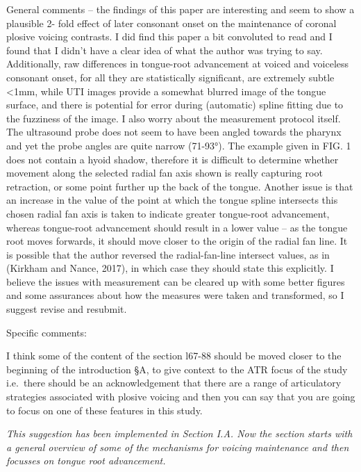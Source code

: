 \documentclass[]{article}
\begin{document}
General comments -- the findings of this paper are interesting and seem
to show a plausible 2- fold effect of later consonant onset on the
maintenance of coronal plosive voicing contrasts. I did find this paper
a bit convoluted to read and I found that I didn't have a clear idea of
what the author was trying to say. Additionally, raw differences in
tongue-root advancement at voiced and voiceless consonant onset, for all
they are statistically significant, are extremely subtle \textless{}1mm,
while UTI images provide a somewhat blurred image of the tongue surface,
and there is potential for error during (automatic) spline fitting due
to the fuzziness of the image. I also worry about the measurement
protocol itself. The ultrasound probe does not seem to have been angled
towards the pharynx and yet the probe angles are quite narrow (71-93°).
The example given in FIG. 1 does not contain a hyoid shadow, therefore
it is difficult to determine whether movement along the selected radial
fan axis shown is really capturing root retraction, or some point
further up the back of the tongue. Another issue is that an increase in
the value of the point at which the tongue spline intersects this chosen
radial fan axis is taken to indicate greater tongue-root advancement,
whereas tongue-root advancement should result in a lower value -- as the
tongue root moves forwards, it should move closer to the origin of the
radial fan line. It is possible that the author reversed the
radial-fan-line intersect values, as in (Kirkham and Nance, 2017), in
which case they should state this explicitly. I believe the issues with
measurement can be cleared up with some better figures and some
assurances about how the measures were taken and transformed, so I
suggest revise and resubmit.

Specific comments:

I think some of the content of the section l67-88 should be moved closer
to the beginning of the introduction §A, to give context to the ATR
focus of the study i.e.~there should be an acknowledgement that there
are a range of articulatory strategies associated with plosive voicing
and then you can say that you are going to focus on one of these
features in this study.

\begin{adjustwidth}{1cm}{} \textit{
This suggestion has been implemented in Section I.A. Now the section starts with a general overview of some of the mechanisms for voicing maintenance and then focusses on tongue root advancement.
} \end{adjustwidth}
\end{document}
